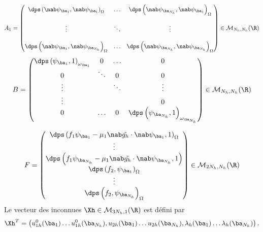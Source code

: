 \documentclass{beamer}
\begin{document}
\begin{frame}
\begin{equation}
A_1=
\begin{pmatrix}
\dps \left(\nab \psi_{{{\ba}_1}}, \nab \psi_{{{\ba}_1}}\right)_{\Omega}  &\ldots& \dps \left(\nab \psi_{{{\ba}_{N_h}}},\nab \psi_{{{\ba}_1}}\right)_{\Omega}\\\\
\vdots& \ddots&\vdots\\\\
\dps \left(\nab \psi_{{{\ba}_1}},\nab \psi_{{{\ba}_{N_h}}}\right)_{\Omega}  &\ldots& \dps \left(\nab \psi_{{{\ba}_{N_h}}},\nab \psi_{{{\ba}_{N_h}}}\right)_{\Omega}
\end{pmatrix}
\in \mathcal{M}_{N_h,N_h}(\R)
\label{eq:matrice_A1}
\end{equation}
\begin{equation}
B=
\begin{pmatrix}
\dps \left(\psi_{{\ba}_1},1\right)_{\omega_{{\ba}_1}}& 0 & \ldots & 0\\
0& \ddots & 0 &0\\
\vdots& &\ddots& \vdots\\
\vdots&  &  & 0\\
0&\ldots& 0&\dps\left(\psi_{{\ba}_{N_h}},1\right)_{\omega_{{\ba}_{N_h}}}
\end{pmatrix}\in \mathcal{M}_{N_h,N_h}(\R)
\label{eq:matrice_de_masse}
\end{equation}
\end{frame}
\begin{frame}
\begin{equation}
F=
\begin{pmatrix}
\dps  \left(f_1 \psi_{{\ba}_1}-\mu_1\nab \tilde{g_h} \cdot \nab \psi_{{\ba}_1},1\right)_{\Omega}\\
\vdots\\
\dps \left(f_1 \psi_{{\ba}_{N_h}}-\mu_1\nab \tilde{g_h} \cdot \nab \psi_{{\ba}_{N_h}},1\right)
\\
\dps \left(f_2,\psi_{{\ba}_1}\right)_{\Omega}\\
\vdots\\
\dps \left(f_2,\psi_{{\ba}_{N_h}}\right)_{\Omega}
\end{pmatrix}
\in \mathcal{M}_{2N_h,N_h}(\R)
\label{eq: definition_matrice_F}
\end{equation}
Le vecteur des inconnues $\Xh \in \mathcal{M}_{3N_h,1}(\R)$ est défini par
\\
\begin{equation*}
\Xh^T=\left(u_{1h}^0({{\ba}_1}) \ldots u_{1h}^0({{\ba}_{N_h}}),u_{2h}({{\ba}_1}) \ldots u_{2h}({{\ba}_{N_h}}),\lambda_h({{\ba}_1}) \ldots \lambda_h({{\ba}_{N_h}})\right).
\end{equation*}
\end{frame}
\end{document}
